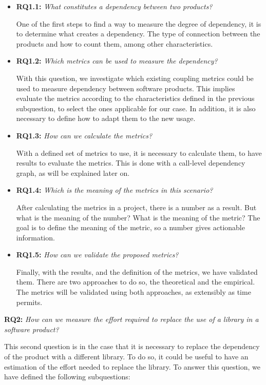 \begin{itemize}
  \item \textbf{RQ1.1:} \textit{What constitutes a dependency between two products?}

  One of the first steps to find a way to measure the degree of dependency, it is to determine what creates a dependency. The type of connection between the products and how to count them, among other characteristics.

  \item \textbf{RQ1.2:} \textit{Which metrics can be used to measure the dependency?}

  With this question, we investigate which existing coupling metrics could be used to measure dependency between software products. This implies evaluate the metrics according to the characteristics defined in the previous subquestion, to select the ones applicable for our case. In addition, it is also necessary to define how to adapt them to the new usage.

  \item \textbf{RQ1.3:} \textit{How can we calculate the metrics?}

  With a defined set of metrics to use, it is necessary to calculate them, to have results to evaluate the metrics. This is done with a call-level dependency graph, as will be explained later on.

  \item \textbf{RQ1.4:} \textit{Which is the meaning of the metrics in this scenario?}

  After calculating the metrics in a project, there is a number as a result. But what is the meaning of the number? What is the meaning of the metric? The goal is to define the meaning of the metric, so a number gives actionable information.

  \item \textbf{RQ1.5:} \textit{How can we validate the proposed metrics?}

  Finally, with the results, and the definition of the metrics, we have validated them. There are two approaches to do so, the theoretical and the empirical. The metrics will be validated using both approaches, as extensibly as time permits.
\end{itemize}

\blankl
\textbf{RQ2:} \textit{How can we measure the effort required to replace the use of a library in a software product?}

This second question is in the case that it is necessary to replace the dependency of the product with a different library. To do so, it could be useful to have an estimation of the effort needed to replace the library. To answer this question, we have defined the following subquestions:

